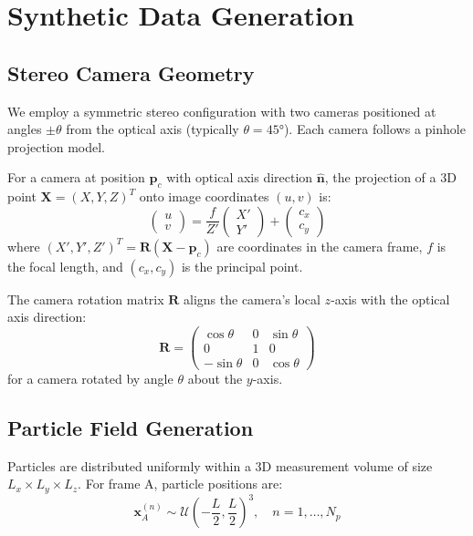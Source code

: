 \documentclass[11pt,a4paper]{article}
\begin{document}
\section{Synthetic Data Generation}

\subsection{Stereo Camera Geometry}

We employ a symmetric stereo configuration with two cameras positioned at angles $\pm\theta$ from the optical axis (typically $\theta = 45°$). Each camera follows a pinhole projection model.

For a camera at position $\mathbf{p}_c$ with optical axis direction $\hat{\mathbf{n}}$, the projection of a 3D point $\mathbf{X} = (X, Y, Z)^T$ onto image coordinates $(u, v)$ is:
\begin{equation}
    \begin{pmatrix} u \\ v \end{pmatrix} = \frac{f}{Z'} \begin{pmatrix} X' \\ Y' \end{pmatrix} + \begin{pmatrix} c_x \\ c_y \end{pmatrix}
\end{equation}
where $(X', Y', Z')^T = \mathbf{R}(\mathbf{X} - \mathbf{p}_c)$ are coordinates in the camera frame, $f$ is the focal length, and $(c_x, c_y)$ is the principal point.

The camera rotation matrix $\mathbf{R}$ aligns the camera's local $z$-axis with the optical axis direction:
\begin{equation}
    \mathbf{R} = \begin{pmatrix}
        \cos\theta & 0 & \sin\theta \\
        0 & 1 & 0 \\
        -\sin\theta & 0 & \cos\theta
    \end{pmatrix}
\end{equation}
for a camera rotated by angle $\theta$ about the $y$-axis.

\subsection{Particle Field Generation}

Particles are distributed uniformly within a 3D measurement volume of size $L_x \times L_y \times L_z$. For frame A, particle positions are:
\begin{equation}
    \mathbf{x}_A^{(n)} \sim \mathcal{U}\left(-\frac{L}{2}, \frac{L}{2}\right)^3, \quad n = 1, \ldots, N_p
\end{equation}
\end{document}
